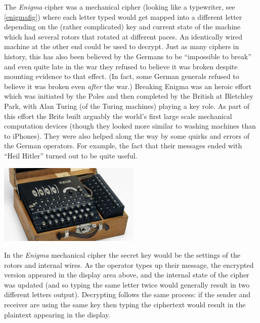 The \emph{Enigma} cipher was a mechanical cipher (looking like a
typewriter, see \cref{enigmafig}) where each letter typed would get
mapped into a different letter depending on the (rather complicated) key
and current state of the machine which had several rotors that rotated
at different paces. An identically wired machine at the other end could
be used to decrypt. Just as many ciphers in history, this has also been
believed by the Germans to be ``impossible to break'' and even quite
late in the war they refused to believe it was broken despite mounting
evidence to that effect. (In fact, some German generals refused to
believe it was broken even \emph{after} the war.) Breaking Enigma was an
heroic effort which was initiated by the Poles and then completed by the
British at Bletchley Park, with Alan Turing (of the Turing machines)
playing a key role. As part of this effort the Brits built arguably the
world's first large scale mechanical computation devices (though they
looked more similar to washing machines than to iPhones). They were also
helped along the way by some quirks and errors of the German operators.
For example, the fact that their messages ended with ``Heil Hitler''
turned out to be quite useful.


\begin{marginfigure}
\centering
\includegraphics[width=\linewidth, height=1.5in, keepaspectratio]{../figure/enigma.jpg}
\caption{In the \emph{Enigma} mechanical cipher the secret key would be
the settings of the rotors and internal wires. As the operator types up
their message, the encrypted version appeared in the display area above,
and the internal state of the cipher was updated (and so typing the same
letter twice would generally result in two different letters output).
Decrypting follows the same process: if the sender and receiver are
using the same key then typing the ciphertext would result in the
plaintext appearing in the display.}
\label{enigmafig}
\end{marginfigure}


